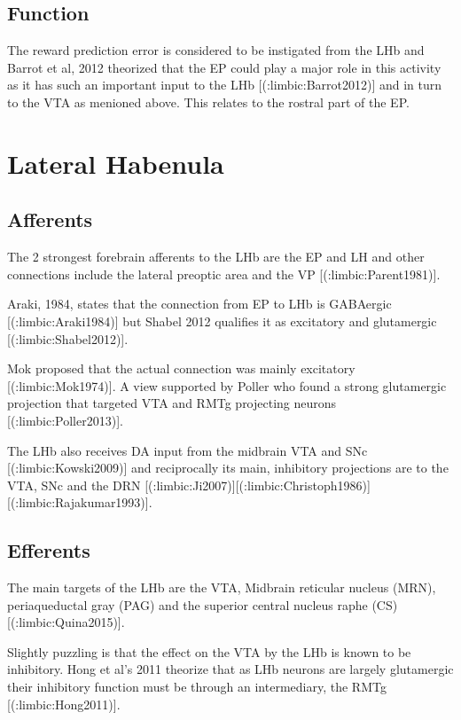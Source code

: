 {{\subsection{Function}

The reward prediction error is considered to be instigated from the LHb and Barrot et al, 2012 theorized that the EP could play a major role in this activity as it has such an important input to the LHb [(:limbic:Barrot2012)] and in turn to the VTA as menioned above. This relates to the rostral part of the EP.







\section{Lateral Habenula}

\subsection{Afferents}

The 2 strongest forebrain afferents to the LHb are the EP and LH and other connections include the lateral preoptic area and the VP [(:limbic:Parent1981)]. 

Araki, 1984, states that the connection from EP to LHb is GABAergic [(:limbic:Araki1984)] but Shabel 2012 qualifies it as excitatory and glutamergic [(:limbic:Shabel2012)].

Mok proposed that the actual connection was mainly excitatory [(:limbic:Mok1974)]. A view supported by Poller who found a strong glutamergic projection that targeted VTA and RMTg projecting neurons [(:limbic:Poller2013)].

The LHb also receives DA input from the midbrain VTA and SNc [(:limbic:Kowski2009)] and reciprocally its main, inhibitory projections are to the VTA, SNc and the DRN [(:limbic:Ji2007)][(:limbic:Christoph1986)][(:limbic:Rajakumar1993)].

\subsection{Efferents}

The main targets of the LHb are the VTA, Midbrain reticular nucleus (MRN), periaqueductal gray (PAG) and the superior central nucleus raphe (CS) [(:limbic:Quina2015)].

Slightly puzzling is that the effect on the VTA by the LHb is known to be inhibitory. Hong et al’s 2011 theorize that as LHb neurons are largely glutamergic their inhibitory function must be through an intermediary, the RMTg [(:limbic:Hong2011)].

}}
